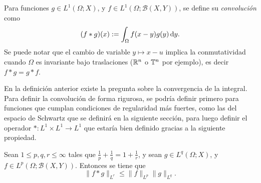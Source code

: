 \begin{definition}[Convoluciones]
    Para funciones $g\in L^1(\Omega;X)$, y $f\in L^1(\Omega; \mathcal{B}(X, Y))$, se define su \textit{convolución} como 	
    \begin{equation*}
        (f*g)(x) := \int_{\Omega} f(x-y)g(y)\mathop{}\!\mathrm{d} y.
    \end{equation*}
    Se puede notar que el cambio de variable $y\mapsto x-u$ implica la
    conmutatividad cuando $\Omega$ es invariante bajo traslaciones ($\mathbb{R}^n$ o $\mathbb{T}^n$ por ejemplo), es decir $f*g=g*f$.
\end{definition}
\begin{remark}
    En la definición anterior existe la pregunta sobre la convergencia de la
    integral. Para definir la convolución de forma rigurosa, se podría definir 
    primero para funciones que cumplan condiciones de regularidad más 
    fuertes, como las del espacio de Schwartz que se definirá en la siguiente
    sección, para luego definir el operador $*:L^1\times L^1 \rightarrow L^1$
    que estaría bien definido gracias a la siguiente propiedad.
\end{remark}
\begin{proposition}
    Sean $1\leq p,q,r\leq \infty$ tales que $\frac{1}{p} + \frac{1}{q} = 1 + 
    \frac{1}{r}$, y sean $g\in L^q(\Omega;X)$, y $f\in L^p(\Omega; \mathcal{B}(X, Y))$. Entonces se tiene que
    \begin{equation*}
        \|f*g\|_{L^r} \leq \|f\|_{L^p} \|g\|_{L^q}.
    \end{equation*}
\end{proposition}
